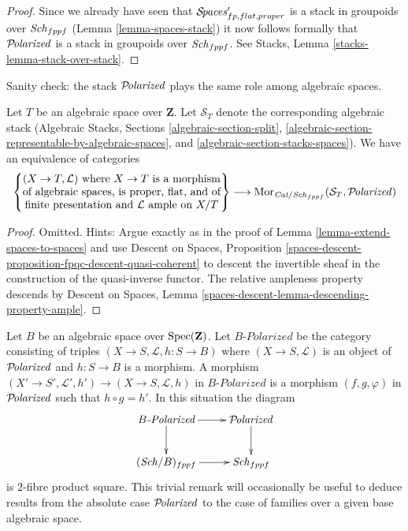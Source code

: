 \begin{proof}
\medskip\noindent
Since we already have seen that $\mathcal{S}\!\mathit{paces}'_{fp, flat, proper}$
is a stack in groupoids over $\mathit{Sch}_{fppf}$
(Lemma \ref{lemma-spaces-stack}) it now follows formally
that $\mathcal{P}\!\mathit{olarized}$ is a stack in groupoids over $\mathit{Sch}_{fppf}$.
See Stacks, Lemma \ref{stacks-lemma-stack-over-stack}.
\end{proof}

\noindent
Sanity check: the stack $\mathcal{P}\!\mathit{olarized}$ plays
the same role among algebraic spaces.

\begin{lemma}
\label{lemma-extend-polarized-to-spaces}
Let $T$ be an algebraic space over $\mathbf{Z}$. Let $\mathcal{S}_T$
denote the corresponding algebraic stack (Algebraic Stacks, Sections
\ref{algebraic-section-split},
\ref{algebraic-section-representable-by-algebraic-spaces}, and
\ref{algebraic-section-stacks-spaces}).
We have an equivalence of categories
$$
\left\{
\begin{matrix}
(X \to T, \mathcal{L})\text{ where }X \to T\text{ is a morphism}\\
\text{of algebraic spaces, is proper, flat, and of}\\
\text{finite presentation and }\mathcal{L}\text{ ample on }X/T
\end{matrix}
\right\}
\longrightarrow
\mathop{\mathrm{Mor}}\nolimits_{\textit{Cat}/\mathit{Sch}_{fppf}}(\mathcal{S}_T, \mathcal{P}\!\mathit{olarized})
$$
\end{lemma}

\begin{proof}
Omitted. Hints: Argue exactly as in the proof of
Lemma \ref{lemma-extend-spaces-to-spaces} and use
Descent on Spaces, Proposition
\ref{spaces-descent-proposition-fpqc-descent-quasi-coherent}
to descent the invertible sheaf in the construction
of the quasi-inverse functor. The relative ampleness property descends
by Descent on Spaces, Lemma
\ref{spaces-descent-lemma-descending-property-ample}.
\end{proof}

\begin{remark}
\label{remark-polarized-base-change}
Let $B$ be an algebraic space over $\mathop{\mathrm{Spec}}(\mathbf{Z})$.
Let $B\textit{-Polarized}$ be the category consisting
of triples $(X \to S, \mathcal{L}, h : S \to B)$
where $(X \to S, \mathcal{L})$ is an object of
$\mathcal{P}\!\mathit{olarized}$ and $h : S \to B$ is a morphism.
A morphism $(X' \to S', \mathcal{L}', h') \to (X \to S, \mathcal{L}, h)$
in $B\textit{-Polarized}$ is a morphism $(f, g, \varphi)$
in $\mathcal{P}\!\mathit{olarized}$ such that $h \circ g = h'$.
In this situation the diagram
$$
\xymatrix{
B\textit{-Polarized} \ar[r] \ar[d] & \Polarizedstack \ar[d] \\
(\Sch/B)_{fppf} \ar[r] & \Sch_{fppf}
}
$$
is $2$-fibre product square. This trivial remark
will occasionally be useful to deduce results from
the absolute case $\mathcal{P}\!\mathit{olarized}$ to the case
of families over a given base algebraic space.
\end{remark}

